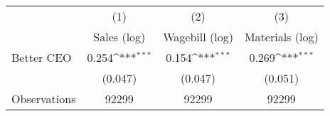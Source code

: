 {
\def\sym#1{\ifmmode^{#1}\else\(^{#1}\)\fi}
\begin{tabular}{l*{3}{c}}
\hline\hline
                    &\multicolumn{1}{c}{(1)}&\multicolumn{1}{c}{(2)}&\multicolumn{1}{c}{(3)}\\
                    &\multicolumn{1}{c}{Sales (log)}&\multicolumn{1}{c}{Wagebill (log)}&\multicolumn{1}{c}{Materials (log)}\\
\hline
Better CEO          &       0.254\sym{***}&       0.154\sym{***}&       0.269\sym{***}\\
                    &     (0.047)         &     (0.047)         &     (0.051)         \\
\hline
Observations        &       92299         &       92299         &       92299         \\
\hline\hline
\end{tabular}
}
